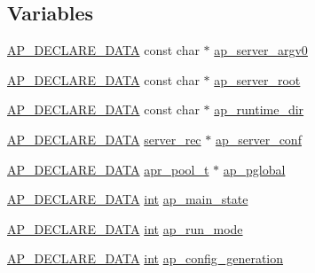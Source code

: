 \subsection*{Variables}
\begin{DoxyCompactItemize}
\item 
\hyperlink{ap__config_8h_a0bb4c3adf74510a0dcdad5b125725fe0}{A\+P\+\_\+\+D\+E\+C\+L\+A\+R\+E\+\_\+\+D\+A\+TA} const char $\ast$ \hyperlink{group__APACHE__CORE__MAIN_ga3b9f35b41e580b91b496512555d1f3b6}{ap\+\_\+server\+\_\+argv0}
\item 
\hyperlink{ap__config_8h_a0bb4c3adf74510a0dcdad5b125725fe0}{A\+P\+\_\+\+D\+E\+C\+L\+A\+R\+E\+\_\+\+D\+A\+TA} const char $\ast$ \hyperlink{group__APACHE__CORE__MAIN_ga1c757ac6b804d090fba90a28bdbb0d8a}{ap\+\_\+server\+\_\+root}
\item 
\hyperlink{ap__config_8h_a0bb4c3adf74510a0dcdad5b125725fe0}{A\+P\+\_\+\+D\+E\+C\+L\+A\+R\+E\+\_\+\+D\+A\+TA} const char $\ast$ \hyperlink{group__APACHE__CORE__MAIN_ga644dd63e382a8aa0c0db473567f0fac9}{ap\+\_\+runtime\+\_\+dir}
\item 
\hyperlink{ap__config_8h_a0bb4c3adf74510a0dcdad5b125725fe0}{A\+P\+\_\+\+D\+E\+C\+L\+A\+R\+E\+\_\+\+D\+A\+TA} \hyperlink{structserver__rec}{server\+\_\+rec} $\ast$ \hyperlink{group__APACHE__CORE__MAIN_ga86736bfc3688ce1b25b1455f24fe740f}{ap\+\_\+server\+\_\+conf}
\item 
\hyperlink{ap__config_8h_a0bb4c3adf74510a0dcdad5b125725fe0}{A\+P\+\_\+\+D\+E\+C\+L\+A\+R\+E\+\_\+\+D\+A\+TA} \hyperlink{structapr__pool__t}{apr\+\_\+pool\+\_\+t} $\ast$ \hyperlink{group__APACHE__CORE__MAIN_gae8d16ca8eacac353b47d8d908c630d94}{ap\+\_\+pglobal}
\item 
\hyperlink{ap__config_8h_a0bb4c3adf74510a0dcdad5b125725fe0}{A\+P\+\_\+\+D\+E\+C\+L\+A\+R\+E\+\_\+\+D\+A\+TA} \hyperlink{pcre_8txt_a42dfa4ff673c82d8efe7144098fbc198}{int} \hyperlink{group__APACHE__CORE__MAIN_ga67bcf52a7e0a100757a834f270ef3fac}{ap\+\_\+main\+\_\+state}
\item 
\hyperlink{ap__config_8h_a0bb4c3adf74510a0dcdad5b125725fe0}{A\+P\+\_\+\+D\+E\+C\+L\+A\+R\+E\+\_\+\+D\+A\+TA} \hyperlink{pcre_8txt_a42dfa4ff673c82d8efe7144098fbc198}{int} \hyperlink{group__APACHE__CORE__MAIN_ga41e1a7a19bc534c1da2de0b00c887ce8}{ap\+\_\+run\+\_\+mode}
\item 
\hyperlink{ap__config_8h_a0bb4c3adf74510a0dcdad5b125725fe0}{A\+P\+\_\+\+D\+E\+C\+L\+A\+R\+E\+\_\+\+D\+A\+TA} \hyperlink{pcre_8txt_a42dfa4ff673c82d8efe7144098fbc198}{int} \hyperlink{group__APACHE__CORE__MAIN_gaa9b53d3fdf7f7d23a4521c700e0f436f}{ap\+\_\+config\+\_\+generation}

\end{DoxyCompactItemize}
